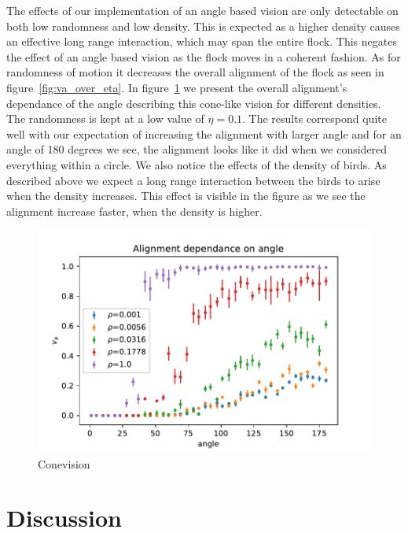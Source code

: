 \documentclass[twoside,twocolumn]{article}
\begin{document}
The effects of our implementation of an angle based vision are only detectable on both low randomness and low density. This is expected as a higher density causes an effective long range interaction, which may span the entire flock. This negates the effect of an angle based vision as the flock moves in a coherent fashion. As for randomness of motion it decreases the overall alignment of the flock as seen in figure~\ref{fig:va_over_eta}. In figure~\ref{fig:conevision} we present the overall alignment's dependance of the angle describing this cone-like vision for different densities. The randomness is kept at a low value of $\eta=0.1$. The results correspond quite well with our expectation of increasing the alignment with larger angle and for an angle of 180 degrees we see, the alignment looks like it did when we considered everything within a circle. We also notice the effects of the density of birds. As described above we expect a long range interaction between the birds to arise when the density increases. This effect is visible in the figure as we see the alignment increase faster, when the density is higher.

\begin{figure}[!htb]
\label{fig:conevision}
  \begin{center}
    \includegraphics[width=\columnwidth]{va_over_angle}
  \end{center}
  \caption{Conevision}
\end{figure}


\section{Discussion}
\end{document}
